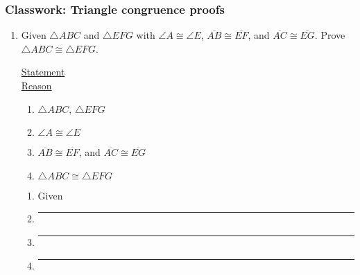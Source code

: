 \documentclass[12pt, twoside]{article}
\begin{document}
\subsubsection*{Classwork: Triangle congruence proofs}
 \begin{enumerate}

  \item Given $\triangle ABC$ and $\triangle EFG$ with $\angle A \cong \angle E$, $\overline{AB} \cong \overline{EF}$, and $\overline{AC} \cong \overline{EG}$. Prove $\triangle ABC \cong \triangle EFG$.\\[0.5cm]

    \begin{multicols}{2}
      \underline{Statement} \\
      \underline{Reason}
    \end{multicols}
    \begin{multicols}{2}
      \raggedcolumns
      \begin{enumerate}[label={\arabic*)}]
        \item $\triangle ABC$, $\triangle EFG$
        \item $\angle A \cong \angle E$
        \item $\overline{AB} \cong \overline{EF}$, and $\overline{AC} \cong \overline{EG}$
        \item $\triangle ABC \cong \triangle EFG$ \\
      \end{enumerate}
      \begin{enumerate}[label={\arabic*)}]
        \item Given
        \item \rule{4cm}{0.15mm}
        \item \rule{4cm}{0.15mm}
        \item \rule{4cm}{0.15mm}
      \end{enumerate}
    \end{multicols}


\end{enumerate}
\end{document}
